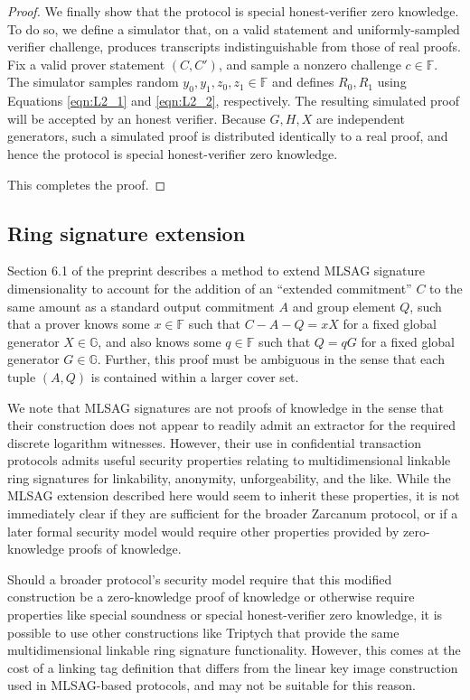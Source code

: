 \documentclass{article}
\newcommand{\G}{\mathbb{G}}
\newcommand{\F}{\mathbb{F}}
\begin{document}
\begin{proof}
	We finally show that the protocol is special honest-verifier zero knowledge.
	To do so, we define a simulator that, on a valid statement and uniformly-sampled verifier challenge, produces transcripts indistinguishable from those of real proofs.
	Fix a valid prover statement $(C,C')$, and sample a nonzero challenge $c \in \F$.
	The simulator samples random $y_0,y_1,z_0,z_1 \in \F$ and defines $R_0,R_1$ using Equations \ref{eqn:L2_1} and \ref{eqn:L2_2}, respectively.
	The resulting simulated proof will be accepted by an honest verifier.
	Because $G,H,X$ are independent generators, such a simulated proof is distributed identically to a real proof, and hence the protocol is special honest-verifier zero knowledge.

	This completes the proof.
\end{proof}


\subsection{Ring signature extension}

Section 6.1 of the preprint describes a method to extend MLSAG \cite{ringct} signature dimensionality to account for the addition of an ``extended commitment'' $C$ to the same amount as a standard output commitment $A$ and group element $Q$, such that a prover knows some $x \in \F$ such that $C - A - Q = xX$ for a fixed global generator $X \in \G$, and also knows some $q \in \F$ such that $Q = qG$ for a fixed global generator $G \in \G$.
Further, this proof must be ambiguous in the sense that each tuple $(A, Q)$ is contained within a larger cover set.

We note that MLSAG signatures are not proofs of knowledge in the sense that their construction does not appear to readily admit an extractor for the required discrete logarithm witnesses.
However, their use in confidential transaction protocols admits useful security properties relating to multidimensional linkable ring signatures for linkability, anonymity, unforgeability, and the like.
While the MLSAG extension described here would seem to inherit these properties, it is not immediately clear if they are sufficient for the broader Zarcanum protocol, or if a later formal security model would require other properties provided by zero-knowledge proofs of knowledge.

Should a broader protocol's security model require that this modified construction be a zero-knowledge proof of knowledge or otherwise require properties like special soundness or special honest-verifier zero knowledge, it is possible to use other constructions like Triptych \cite{triptych} that provide the same multidimensional linkable ring signature functionality.
However, this comes at the cost of a linking tag definition that differs from the linear key image construction used in MLSAG-based protocols, and may not be suitable for this reason.
\end{document}
